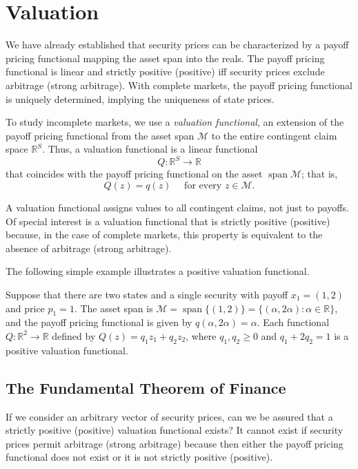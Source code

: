 \documentclass[\topdir/lecture\_notes.tex]{subfiles}
\begin{document}
\section{Valuation}
We have already established that security prices can be characterized by a payoff pricing functional mapping the asset span into the reals. The payoff pricing functional is linear and strictly positive (positive) iff security prices exclude arbitrage (strong arbitrage). With complete markets, the payoff pricing functional is uniquely determined, implying the uniqueness of state prices. 

To study incomplete markets, we use a \emph{valuation functional}, an extension of the payoff pricing functional from the asset span $\mathcal{M}$ to the entire contingent claim space $\mathbb{R}^{S}$. Thus, a valuation functional is a linear functional
\begin{equation*}
Q: \mathbb{R}^{S} \rightarrow \mathbb{R} 
\end{equation*}
that coincides with the payoff pricing functional on the asset $\operatorname{span} \mathcal{M}$; that is,
\begin{equation*}
Q(z)=q(z) \quad \text { for every } z \in \mathcal{M}. 
\end{equation*}

A valuation functional assigns values to all contingent claims, not just to payoffs. Of special interest is a valuation functional that is strictly positive (positive) because, in the case of complete markets, this property is equivalent to the absence of arbitrage (strong arbitrage).

The following simple example illustrates a positive valuation functional.

\begin{example} \label{ex:positive_valuation_functional}
Suppose that there are two states and a single security with payoff $x_{1}=(1,2)$ and price $p_{1}=1$. The asset span is $\mathcal{M}=\operatorname{span}\{(1,2)\}=\{(\alpha, 2 \alpha) \colon \alpha \in \mathbb{R}\}$, and the payoff pricing functional is given by $q(\alpha, 2 \alpha)=\alpha$. Each functional $Q \colon \mathbb{R}^{2} \rightarrow \mathbb{R}$ defined by $Q(z)=q_{1} z_{1}+q_{2} z_{2}$, where $q_{1}, q_{2} \geq 0$ and $q_{1}+2 q_{2}=1$ is a positive valuation functional.
\end{example}

\subsection{The Fundamental Theorem of Finance}
If we consider an arbitrary vector of security prices, can we be assured that a strictly positive (positive) valuation functional exists? It cannot exist if security prices permit arbitrage (strong arbitrage) because then either the payoff pricing functional does not exist or it is not strictly positive (positive).
\end{document}
